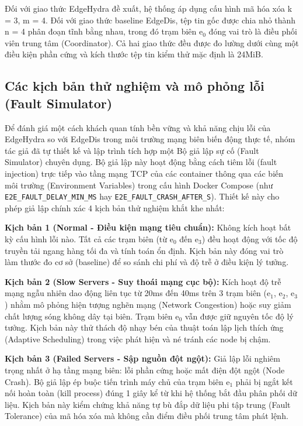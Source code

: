 \documentclass[11pt,a4paper]{article}
\begin{document}
Đối với giao thức EdgeHydra đề xuất, hệ thống áp dụng cấu hình mã hóa xóa k = 3, m = 4. Đối với giao thức baseline EdgeDis, tệp tin gốc được chia nhỏ thành n = 4 phân đoạn tĩnh bằng nhau, trong đó trạm biên e\ensuremath{_0} đóng vai trò là điều phối viên trung tâm (Coordinator). Cả hai giao thức đều được đo lường dưới cùng một điều kiện phần cứng và kích thước tệp tin kiểm thử mặc định là 24MiB.

\subsection{Các kịch bản thử nghiệm và mô phỏng lỗi (Fault Simulator)}

Để đánh giá một cách khách quan tính bền vững và khả năng chịu lỗi của EdgeHydra so với EdgeDis trong môi trường mạng biên biến động thực tế, nhóm tác giả đã tự thiết kế và lập trình tích hợp một Bộ giả lập sự cố (Fault Simulator) chuyên dụng. Bộ giả lập này hoạt động bằng cách tiêm lỗi (fault injection) trực tiếp vào tầng mạng TCP của các container thông qua các biến môi trường (Environment Variables) trong cấu hình Docker Compose (như \texttt{E2E\_FAULT\_DELAY\_MIN\_MS} hay \texttt{E2E\_FAULT\_CRASH\_AFTER\_S}). Thiết kế này cho phép giả lập chính xác 4 kịch bản thử nghiệm khắt khe nhất:

\textbf{Kịch bản 1 (Normal - Điều kiện mạng tiêu chuẩn):} Không kích hoạt bất kỳ cấu hình lỗi nào. Tất cả các trạm biên (từ e\ensuremath{_0} đến e\ensuremath{_3}) đều hoạt động với tốc độ truyền tải ngang hàng tối đa và tính toán ổn định. Kịch bản này đóng vai trò làm thước đo cơ sở (baseline) để so sánh chi phí và độ trễ ở điều kiện lý tưởng.

\textbf{Kịch bản 2 (Slow Servers - Suy thoái mạng cục bộ):} Kích hoạt độ trễ mạng ngẫu nhiên dao động liên tục từ 20ms đến 40ms trên 3 trạm biên (e\ensuremath{_1}, e\ensuremath{_2}, e\ensuremath{_3}) nhằm mô phỏng hiện tượng nghẽn mạng (Network Congestion) hoặc suy giảm chất lượng sóng không dây tại biên. Trạm biên e\ensuremath{_0} vẫn được giữ nguyên tốc độ lý tưởng. Kịch bản này thử thách độ nhạy bén của thuật toán lập lịch thích ứng (Adaptive Scheduling) trong việc phát hiện và né tránh các node bị chậm.

\textbf{Kịch bản 3 (Failed Servers - Sập nguồn đột ngột):} Giả lập lỗi nghiêm trọng nhất ở hạ tầng mạng biên: lỗi phần cứng hoặc mất điện đột ngột (Node Crash). Bộ giả lập ép buộc tiến trình máy chủ của trạm biên e\ensuremath{_1} phải bị ngắt kết nối hoàn toàn (kill process) đúng 1 giây kể từ khi hệ thống bắt đầu phân phối dữ liệu. Kịch bản này kiểm chứng khả năng tự bù đắp dữ liệu phi tập trung (Fault Tolerance) của mã hóa xóa mà không cần điểm điều phối trung tâm phát lệnh.
\end{document}
